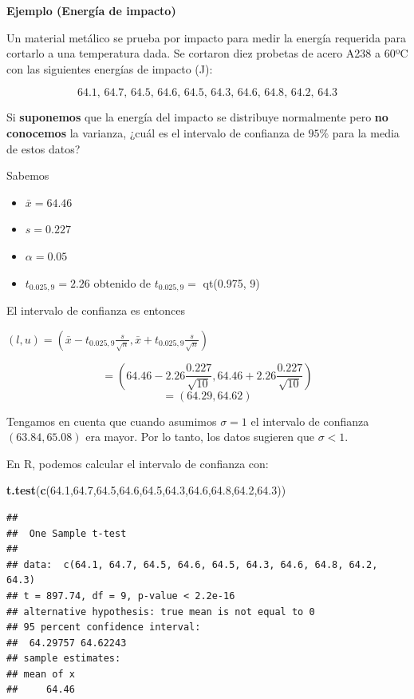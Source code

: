 \documentclass[
]{book}
\newenvironment{Shaded}{\begin{snugshade}}{\end{snugshade}}
\newcommand{\FloatTok}[1]{\textcolor[rgb]{0.00,0.00,0.81}{#1}}
\newcommand{\FunctionTok}[1]{\textcolor[rgb]{0.13,0.29,0.53}{\textbf{#1}}}
\newcommand{\NormalTok}[1]{#1}
\providecommand{\tightlist}{%
  \setlength{\itemsep}{0pt}\setlength{\parskip}{0pt}}
\begin{document}
\textbf{Ejemplo (Energía de impacto)}

Un material metálico se prueba por impacto para medir la energía requerida para cortarlo a una temperatura dada. Se cortaron diez probetas de acero A238 a 60ºC con las siguientes energías de impacto (J):

\[64.1,\, 64.7,\, 64.5,\, 64.6,\, 64.5,\, 64.3,\, 64.6,\, 64.8,\, 64.2,\, 64.3\]

Si \textbf{suponemos} que la energía del impacto se distribuye normalmente pero \textbf{no conocemos} la varianza, ¿cuál es el intervalo de confianza de \(95\%\) para la media de estos datos?

Sabemos

\begin{itemize}
\tightlist
\item
  \(\bar{x}=64.46\)
\item
  \(s=0.227\)
\item
  \(\alpha=0.05\)
\item
  \(t_{0.025,9}=2.26\) obtenido de \(t_{0.025,9}=\) qt(0.975, 9)
\end{itemize}

El intervalo de confianza es entonces

\((l,u)=(\bar{x}- t_{0.025,9}\frac{s}{\sqrt{n}},\bar{x}+t_{0.025,9} \frac{s} {\sqrt{n}})\)

\[=(64.46-2.26 \frac{0.227}{\sqrt{10}},64.46+2.26 \frac{0.227}{\sqrt{10}})\] \[=(64.29,64.62)\]

Tengamos en cuenta que cuando asumimos \(\sigma=1\) el intervalo de confianza \((63.84,65.08)\) era mayor. Por lo tanto, los datos sugieren que \(\sigma<1\).

En R, podemos calcular el intervalo de confianza con:

\begin{Shaded}
\begin{Highlighting}[]
\FunctionTok{t.test}\NormalTok{(}\FunctionTok{c}\NormalTok{(}\FloatTok{64.1}\NormalTok{,}\FloatTok{64.7}\NormalTok{,}\FloatTok{64.5}\NormalTok{,}\FloatTok{64.6}\NormalTok{,}\FloatTok{64.5}\NormalTok{,}\FloatTok{64.3}\NormalTok{,}\FloatTok{64.6}\NormalTok{,}\FloatTok{64.8}\NormalTok{,}\FloatTok{64.2}\NormalTok{,}\FloatTok{64.3}\NormalTok{))}
\end{Highlighting}
\end{Shaded}

\begin{verbatim}
## 
##  One Sample t-test
## 
## data:  c(64.1, 64.7, 64.5, 64.6, 64.5, 64.3, 64.6, 64.8, 64.2, 64.3)
## t = 897.74, df = 9, p-value < 2.2e-16
## alternative hypothesis: true mean is not equal to 0
## 95 percent confidence interval:
##  64.29757 64.62243
## sample estimates:
## mean of x 
##     64.46
\end{verbatim}
\end{document}
